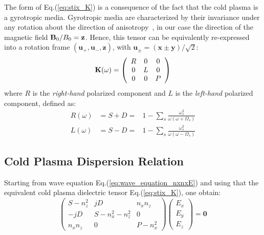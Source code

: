 The form of Eq.(\ref{eq:stix_K}) is a consequence of the fact that the cold plasma is a gyrotropic media. Gyrotropic media are characterized by their invariance under any rotation about the direction of anisotropy~, in our case the direction of the magnetic field ${\mathbf B}_0/B_0=\mathbf{z}$. Hence, this tensor can be equivalently re-expressed into a rotation frame $(\mathbf{u}_{+}, \mathbf{u}_{-},  \mathbf{z})$, with $\mathbf{u}_{\pm}=(\mathbf{x}\pm \mathbf{y})/\sqrt{2}$:  
\begin{equation}
{\mathbf K}(\omega)
=
\left(\begin{array}{ccc}
R & 0 & 0\\
0 & L & 0\\
0 & 0 & P
\end{array}\right)
\label{eq:stix_K_RLP}
\end{equation}
where $R$ is the \textit{right-hand} polarized component and $L$ is the \textit{left-hand} polarized component, defined as:
\begin{subequations}
	\begin{eqnarray}
	R(\omega) 
	& = S + D = & 
	1-\sum_{s}\frac{\omega_{s}^{2}}{\omega(\omega+\Omega_{s})}
	\label{eq:stix_R}
	\\
	L(\omega)
	& = S - D = & 
	1-\sum_{s}\frac{\omega_{s}^{2}}{\omega(\omega-\Omega_{s})}
	\label{eq:stix_L}
	\end{eqnarray}
	\label{eq:stix_RL}
\end{subequations}


\subsection{Cold Plasma Dispersion Relation}
Starting from wave equation Eq.(\ref{eq:wave_equation_nxnxE}) and using that the equivalent cold plasma dielectric tensor Eq.(\ref{eq:stix_K}), one obtain:
\begin{equation}
\left(\begin{array}{ccc}
S - n_{z}^{2} & jD & n_{x}n_{z}\\
-jD & S - n_{x}^{2} - n_{z}^{2} & 0\\
n_{x}n_{z} & 0 & P - n_{x}^{2}
\end{array}\right)\left(\begin{array}{c}
E_{x}\\
E_{y}\\
E_{z}
\end{array}\right)=\mathbf{0}
\label{eq:relation_disp_matr_froid}
\end{equation}

